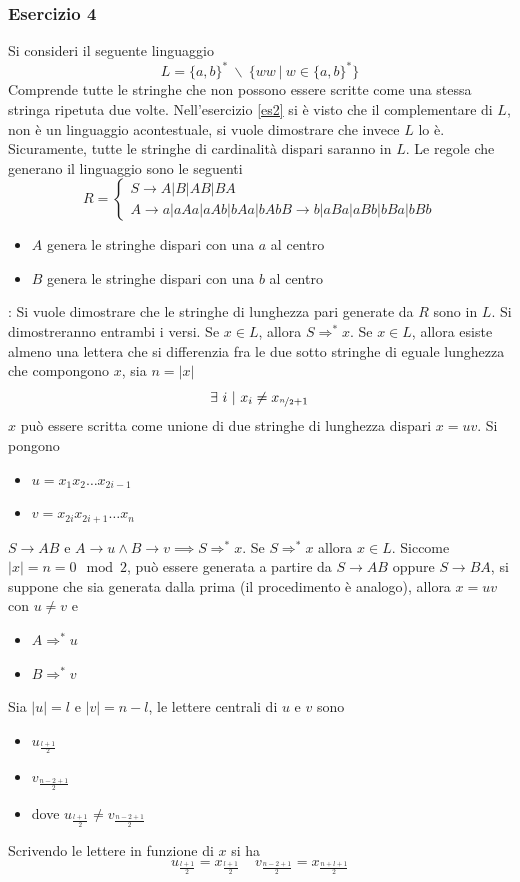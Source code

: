 \documentclass[10pt, letterpaper]{report}
\begin{document}
\subsubsection{Esercizio 4}
Si consideri il seguente linguaggio $$ L=\{a,b\}^* \ \backslash \ \{ww\ | \ w\in\{a,b\}^*\}$$
Comprende tutte le stringhe che non possono essere scritte come una stessa stringa ripetuta due volte. Nell'esercizio 
\ref{es2} si è visto 
che il complementare di $L$, non è un linguaggio acontestuale, si vuole dimostrare che invece $L$ lo è. Sicuramente, 
tutte le stringhe di cardinalità dispari saranno in $L$. Le regole che generano il linguaggio sono le seguenti$$ 
R=\begin{cases}
    S\longrightarrow A|B|AB|BA\\ 
    A\longrightarrow a|aAa|aAb|bAa|bAb 
    B\longrightarrow b|aBa|aBb|bBa|bBb 
\end{cases}
$$\begin{itemize}
    \item $A$ genera le stringhe dispari con una $a$ al centro
    \item $B$ genera le stringhe dispari con una $b$ al centro
\end{itemize}
\dimo{} : Si vuole dimostrare che le stringhe di lunghezza pari generate da $R$ sono in $L$. Si dimostreranno entrambi i 
versi.\acc 
\boxedMath{$\implies$} Se $x\in L$, allora $S\Rightarrow^* x$. Se $x\in L$, allora esiste almeno una lettera che si differenzia fra le due sotto stringhe di eguale 
lunghezza che compongono $x$, sia $n=|x|$
$$\exists \ i \ | \ x_i\ne x_{\nicefrac{n}{2}+1} $$
$x$ può essere scritta come unione di due 
stringhe di lunghezza dispari $x=uv$. Si pongono \begin{itemize}
    \item $u=x_1x_2\dots x_{2i-1}$
    \item $v=x_{2i}x_{2i+1}\dots x_n$
\end{itemize}
$S\longrightarrow AB$ e $A\longrightarrow u \land B\longrightarrow v \implies S\Rightarrow^* x$.\acc 
\boxedMath{$\impliedby$} Se $S\Rightarrow^* x$ allora $x\in L$. 
Siccome $|x|=n=0\mod 2$, può essere generata a partire da $S\longrightarrow AB$ oppure $S\longrightarrow BA$, si suppone che 
sia generata dalla prima (il procedimento è analogo), 
allora $x=uv$ con $u\ne v$ e \begin{itemize}
    \item $A\Rightarrow^* u$
    \item $B\Rightarrow^* v$
\end{itemize}
Sia $|u|=l$ e $|v|=n-l$, le lettere centrali di $u$ e $v$ sono \begin{itemize}
    \item $u_{\frac{l+1}{2}}$
    \item $v_{\frac{n-2+1}{2}}$
    \item dove $u_{\frac{l+1}{2}}\ne v_{\frac{n-2+1}{2}}$
\end{itemize}
Scrivendo le lettere in funzione di $x$ si ha 
$$ u_{\frac{l+1}{2}}=x_{\frac{l+1}{2}} \ \ \ \  \  v_{\frac{n-2+1}{2}}=x_{\frac{n+l+1}{2}}
$$
\end{document}
